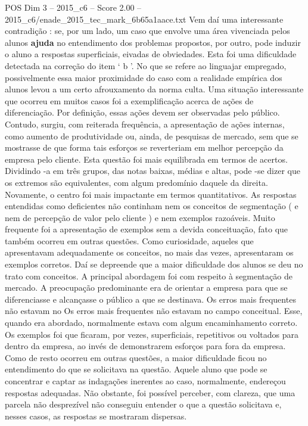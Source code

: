 \begin{textsample}{POS Dim 3 – 2015\_c6 – Score 2.00 – 2015\_c6/enade\_2015\_tec\_mark\_6b65a1aace.txt}
Vem daí uma interessante contradição : se, por um lado, um caso que envolve uma área vivenciada pelos alunos \textbf{ajuda} no entendimento dos problemas propostos, por outro, pode induzir o aluno a respostas superficiais, eivadas de obviedades.
Esta foi uma dificuldade detectada na correção do item ‘ b ’.
No que se refere ao linguajar empregado, possivelmente essa maior proximidade do caso com a realidade empírica dos alunos levou a um certo afrouxamento da norma culta.
Uma situação interessante que ocorreu em muitos casos foi a exemplificação acerca de ações de diferenciação.
Por definição, essas ações devem ser observadas pelo público.
Contudo, surgiu, com reiterada frequência, a apresentação de ações internas, como aumento de produtividade ou, ainda, de pesquisas de mercado, sem que se mostrasse de que forma tais esforços se reverteriam em melhor percepção da empresa pelo cliente.
Esta questão foi mais equilibrada em termos de acertos.
Dividindo -a em três grupos, das notas baixas, médias e altas, pode -se dizer que os extremos são equivalentes, com algum predomínio daquele da direita.
Novamente, o centro foi mais impactante em termos quantitativos.
As respostas entendidas como deficientes não continham nem os conceitos de segmentação ( e nem de percepção de valor pelo cliente ) e nem exemplos razoáveis.
Muito frequente foi a apresentação de exemplos sem a devida conceituação, fato que também ocorreu em outras questões.
Como curiosidade, aqueles que apresentavam adequadamente os conceitos, no mais das vezes, apresentaram os exemplos corretos.
Daí se depreende que a maior dificuldade dos alunos se deu no trato com conceitos.
A principal abordagem foi com respeito à segmentação de mercado.
A preocupação predominante era de orientar a empresa para que se diferenciasse e alcançasse o público a que se destinava.
Os erros mais frequentes não estavam no Os erros mais frequentes não estavam no campo conceitual.
Esse, quando era abordado, normalmente estava com algum encaminhamento correto.
Os exemplos foi que ficaram, por vezes, superficiais, repetitivos ou voltados para dentro da empresa, ao invés de demonstrarem esforços para fora da empresa.
Como de resto ocorreu em outras questões, a maior dificuldade ficou no entendimento do que se solicitava na questão.
Aquele aluno que pode se concentrar e captar as indagações inerentes ao caso, normalmente, endereçou respostas adequadas.
Não obstante, foi possível perceber, com clareza, que uma parcela não desprezível não conseguiu entender o que a questão solicitava e, nesses casos, as respostas se mostraram dispersas.

\end{textsample}
